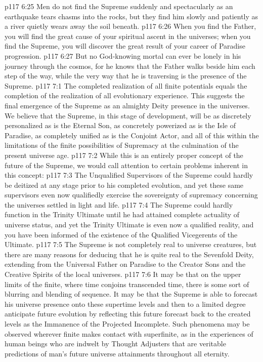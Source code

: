 \vs p117 6:25 \pc Men do not find the Supreme suddenly and spectacularly as an earthquake tears chasms into the rocks, but they find him slowly and patiently as a river quietly wears away the soil beneath.
\vs p117 6:26 When you find the Father, you will find the great cause of your spiritual ascent in the universes; when you find the Supreme, you will discover the great result of your career of Paradise progression.
\vs p117 6:27 But no God\hyp{}knowing mortal can ever be lonely in his journey through the cosmos, for he knows that the Father walks beside him each step of the way, while the very way that he is traversing is the presence of the Supreme.
\vs p117 7:1 The completed realization of all finite potentials equals the completion of the realization of all evolutionary experience. This suggests the final emergence of the Supreme as an almighty Deity presence in the universes. We believe that the Supreme, in this stage of development, will be as discretely personalized as is the Eternal Son, as concretely powerized as is the Isle of Paradise, as completely unified as is the Conjoint Actor, and all of this within the limitations of the finite possibilities of Supremacy at the culmination of the present universe age.
\vs p117 7:2 While this is an entirely proper concept of the future of the Supreme, we would call attention to certain problems inherent in this concept:
\vs p117 7:3 \bibnobreakspace The Unqualified Supervisors of the Supreme could hardly be deitized at any stage prior to his completed evolution, and yet these same supervisors even now qualifiedly exercise the sovereignty of supremacy concerning the universes settled in light and life.
\vs p117 7:4 \bibnobreakspace The Supreme could hardly function in the Trinity Ultimate until he had attained complete actuality of universe status, and yet the Trinity Ultimate is even now a qualified reality, and you have been informed of the existence of the Qualified Vicegerents of the Ultimate.
\vs p117 7:5 \bibnobreakspace The Supreme is not completely real to universe creatures, but there are many reasons for deducing that he is quite real to the Sevenfold Deity, extending from the Universal Father on Paradise to the Creator Sons and the Creative Spirits of the local universes.
\vs p117 7:6 \pc It may be that on the upper limits of the finite, where time conjoins transcended time, there is some sort of blurring and blending of sequence. It may be that the Supreme is able to forecast his universe presence onto these supertime levels and then to a limited degree anticipate future evolution by reflecting this future forecast back to the created levels as the Immanence of the Projected Incomplete. Such phenomena may be observed wherever finite makes contact with superfinite, as in the experiences of human beings who are indwelt by Thought Adjusters that are veritable predictions of man’s future universe attainments throughout all eternity.
